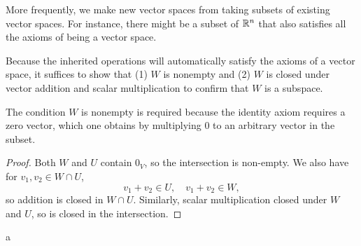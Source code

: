 More frequently, we make new vector spaces from taking subsets of existing vector spaces. For instance, there might be a subset of $\mathbb{R}^n$ that also satisfies all the axioms of being a vector space.

\begin{remark}
	Because the inherited operations will automatically satisfy the axioms of a vector space, it suffices to show that (1) $W$ is nonempty and (2) $W$ is closed under vector addition and scalar multiplication to confirm that $W$ is a subspace.
\end{remark}
The condition $W$ is nonempty is required because the identity axiom requires a zero vector, which one obtains by multiplying $0$ to an arbitrary vector in the subset.
\begin{proof}
	Both $W$ and $U$ contain $0_V$, so the intersection is non-empty. We also have for $v_1,v_2\in W\cap U$,\[
		v_1 + v_2 \in U, \quad v_1+v_2\in W,
	\] so addition is closed in $W\cap U$. Similarly, scalar multiplication closed under $W$ and $U$, so is closed in the intersection.
\end{proof}
\exercises
\begin{exerciselist}
	\item a
\end{exerciselist}

